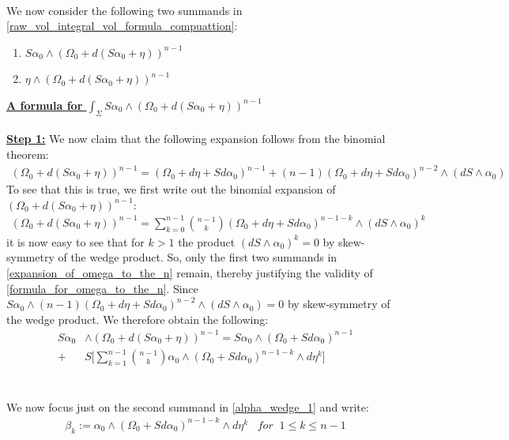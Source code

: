 \documentclass[11pt]{amsart}
\theoremstyle{plain}
\theoremstyle{definition}
\theoremstyle{remark}
\begin{document}
\\
We now consider the following two summands in \eqref{raw_vol_integral_vol_formula_compuattion}:
\begin{enumerate}
    \item $S\alpha_0 \wedge (\Omega_0 +  d(S\alpha_0 + \eta))^{n-1}$
    \item $\eta  \wedge (\Omega_0 + d(S\alpha_0 + \eta))^{n-1}$
\end{enumerate}
\textbf{\underline{A formula for $\int_{\Sigma} S\alpha_0 \wedge (\Omega_0 +  d(S\alpha_0 + \eta))^{n-1}$}}\\
\\
\textbf{\underline{Step 1:}}
We now claim that the following expansion follows from the binomial theorem:
 \begin{align}\label{formula_for_omega_to_the_n}
    (\Omega_0 + d(S\alpha_0 + \eta ))^{n-1} = (\Omega_0 + d\eta +Sd\alpha_0)^{n-1} + (n-1)(\Omega_0 + d\eta +Sd\alpha_0)^{n-2} \wedge (dS \wedge \alpha_0)
\end{align}
To see that this is true, we first write out the binomial expansion of $(\Omega_0 + d(S\alpha_0 + \eta ))^{n-1}$:
\begin{align}\label{expansion_of_omega_to_the_n}
     (\Omega_0 + d(S\alpha_0 + \eta ))^{n-1} = \sum^{n-1}_{k=0} \binom{n-1}{k} (\Omega_0 + d\eta +Sd\alpha_0)^{n-1-k} \wedge (dS \wedge \alpha_0)^k
\end{align}
it is now easy to see that for $k >1$ the product $(dS \wedge \alpha_0)^k =0$ by skew-symmetry of the wedge product. So, only the first two summands in \eqref{expansion_of_omega_to_the_n} remain, thereby justifying the validity of \eqref{formula_for_omega_to_the_n}. 
Since $S\alpha_0 \wedge (n-1)(\Omega_0 + d\eta +Sd\alpha_0)^{n-2} \wedge (dS \wedge \alpha_0) =0$ by skew-symmetry of the wedge product. We therefore obtain the following:
\begin{align}\label{alpha_wedge_1}
 S\alpha_0 &\wedge (\Omega_0 +  d(S\alpha_0 + \eta))^{n-1}   = S\alpha_0 \wedge (\Omega_0 +Sd\alpha_0)^{n-1} \\\nonumber + &S\Bigg[ \sum_{k=1}^{n-1} \binom{n-1}{k} \alpha_0 \wedge (\Omega_0 +Sd\alpha_0)^{n-1-k} \wedge d\eta^k \Bigg]
\end{align}
\\
\\
We now focus just on the second summand in \eqref{alpha_wedge_1} and write:
\begin{align}\label{def_beta_k}
    \beta_k := \alpha_0 \wedge (\Omega_0 +Sd\alpha_0)^{n-1-k} \wedge d\eta^k  \;\;\; for \;\; 1\leq k \leq n-1 
\end{align}
\end{document}
